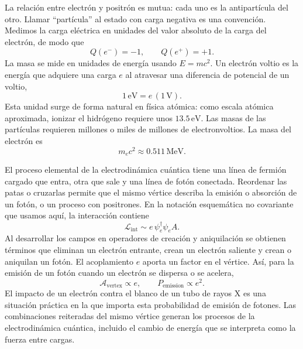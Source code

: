 La relación entre electrón y positrón es mutua: cada uno es la antipartícula del otro. Llamar ``partícula'' al estado con carga negativa es una convención. Medimos la carga eléctrica en unidades del valor absoluto de la carga del electrón, de modo que
\begin{equation}
Q(e^-)=-1,\qquad Q(e^+)=+1.
\end{equation}
La masa se mide en unidades de energía usando \(E=mc^2\). Un electrón voltio es la energía que adquiere una carga \(e\) al atravesar una diferencia de potencial de un voltio,
\begin{equation}
1\,\mathrm{eV}=e\,(1\,\mathrm V).
\end{equation}
Esta unidad surge de forma natural en física atómica: como escala atómica aproximada, ionizar el hidrógeno requiere unos \(13.5\,\mathrm{eV}\). Las masas de las partículas requieren millones o miles de millones de electronvoltios. La masa del electrón es
\begin{equation}
m_e c^2 \approx 0.511\,\mathrm{MeV}.
\end{equation}

\begin{classroomqa}
\end{classroomqa}

El proceso elemental de la electrodinámica cuántica tiene una línea de fermión cargado que entra, otra que sale y una línea de fotón conectada. Reordenar las patas o cruzarlas permite que el mismo vértice describa la emisión o absorción de un fotón, o un proceso con positrones. En la notación esquemática no covariante que usamos aquí, la interacción contiene
\begin{equation}
\mathcal{L}_{\mathrm{int}}\sim e\,\psi_e^\dagger \psi_e A.
\end{equation}
Al desarrollar los campos en operadores de creación y aniquilación se obtienen términos que eliminan un electrón entrante, crean un electrón saliente y crean o aniquilan un fotón. El acoplamiento \(e\) aporta un factor en el vértice. Así, para la emisión de un fotón cuando un electrón se dispersa o se acelera,
\begin{equation}
\mathcal{A}_{\mathrm{vertex}}\propto e,
\qquad
P_{\mathrm{emission}}\propto e^2.
\end{equation}
El impacto de un electrón contra el blanco de un tubo de rayos X es una situación práctica en la que importa esta probabilidad de emisión de fotones. Las combinaciones reiteradas del mismo vértice generan los procesos de la electrodinámica cuántica, incluido el cambio de energía que se interpreta como la fuerza entre cargas.

